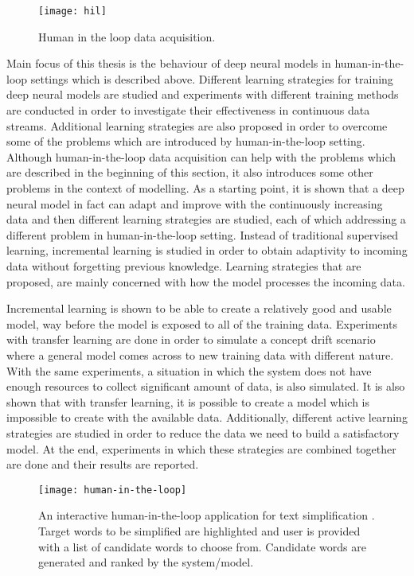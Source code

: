 \begin{figure}[h]
\texttt{[image: hil]}
\centering
\caption{Human in the loop data acquisition.}
\end{figure}

Main focus of this thesis is the behaviour of deep neural models in human-in-the-loop settings which is described above. Different learning strategies for training deep neural models are studied and experiments with different training methods are conducted in order to investigate their effectiveness in continuous data streams. Additional learning strategies are also proposed in order to overcome some of the problems which are introduced by human-in-the-loop setting. Although human-in-the-loop data acquisition can help with the problems which are described in the beginning of this section, it also introduces some other problems in the context of modelling. As a starting point, it is shown that a deep neural model in fact can adapt and improve with the continuously increasing data and then different learning strategies are studied, each of which addressing a different problem in human-in-the-loop setting. Instead of traditional supervised learning, incremental learning is studied in order to obtain adaptivity to incoming data without forgetting previous knowledge. Learning strategies that are proposed, are mainly concerned with how the model processes the incoming data. 

Incremental learning is shown to be able to create a relatively good and usable model, way before the model is exposed to all of the training data. Experiments with transfer learning are done in order to simulate a concept drift scenario where a general model comes across to new training data with different nature. With the same experiments, a situation in which the system does not have enough resources to collect significant amount of data, is also simulated. It is also shown that with transfer learning, it is possible to create a model which is impossible to create with the available data. Additionally, different active learning strategies are studied in order to reduce the data we need to build a satisfactory model.  At the end, experiments in which these strategies are combined together are done and their results are reported.

\begin{figure}[h]
\texttt{[image: human-in-the-loop]}
\centering
\caption{An interactive human-in-the-loop application for text simplification \cite{par4sim}. Target words to be simplified are highlighted and user is provided with a list of candidate words to choose from. Candidate words are generated and ranked by the system/model.}
\end{figure}



